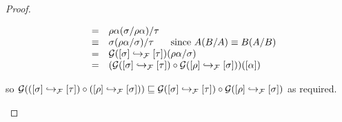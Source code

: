 \begin{proof}
\begin{enumerate}
\begin{enumerate}
\[\begin{array}{rcll}
      & = & \rho\alpha(\sigma/\rho\alpha)/\tau \\
      & \equiv & \sigma(\rho\alpha/\sigma)/\tau \hspace{.5cm}\text{ since $A(B/A) \equiv B(A/B)$} \\
      & = & \mathcal{G}({[\sigma]} \hookrightarrow_{\mathcal{F}} {[\tau]})(\rho\alpha/\sigma) \\
      & = & (\mathcal{G}({[\sigma]} \hookrightarrow_{\mathcal{F}} {[\tau]}) \circ \mathcal{G}({[\rho]} \hookrightarrow_{\mathcal{F}} {[\sigma]}))({[\alpha]})
      \end{array}
    \]
  \end{enumerate}
  so
  $\mathcal{G}(({[\sigma]} \hookrightarrow_{\mathcal{F}} {[\tau]}) \circ ({[\rho]} \hookrightarrow_{\mathcal{F}} {[\sigma]}))
  \sqsubseteq
  \mathcal{G}({[\sigma]} \hookrightarrow_{\mathcal{F}} {[\tau]}) \circ \mathcal{G}({[\rho]} \hookrightarrow_{\mathcal{F}} {[\sigma]})$
  as required.


\end{enumerate}
\end{proof}
